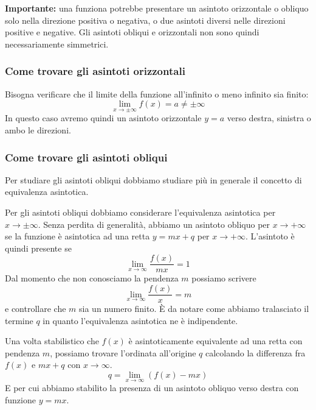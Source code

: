 \documentclass{article}
\begin{document}
\textbf{\color{red}Importante:} una funziona potrebbe presentare un asintoto orizzontale o obliquo
solo nella direzione positiva o negativa, o due asintoti diversi nelle direzioni positive e negative.
Gli asintoti obliqui e orizzontali non sono quindi necessariamente simmetrici.

\subsubsection{Come trovare gli asintoti orizzontali}

Bisogna verificare che il limite della funzione
all'infinito o meno infinito sia finito:\\
\[\lim_{x \to \pm\infty} f(x) = a \neq \pm\infty\]
In questo caso avremo quindi un asintoto orizzontale \(y=a\)
verso destra, sinistra o ambo le direzioni.

\subsubsection{Come trovare gli asintoti obliqui}

Per studiare gli asintoti obliqui dobbiamo studiare più in generale il concetto di equivalenza asintotica.


Per gli asintoti obliqui dobbiamo considerare l'equivalenza asintotica
per \(x \to \pm \infty\).
Senza perdita di generalità, abbiamo un asintoto obliquo per \(x \to +\infty\)
se la funzione è asintotica ad una retta \(y=mx+q\) per \(x \to +\infty\).
L'asintoto è quindi presente se
\[
    \lim_{x \to \infty} \frac{f(x)}{mx} = 1
\]
Dal momento che non conosciamo la pendenza \(m\) possiamo scrivere 
\[
    \lim_{x \to \infty} \frac{f(x)}{x} = m
\]
e controllare che \(m\) sia un numero finito.
È da notare come abbiamo tralasciato il termine \(q\) in quanto l'equivalenza asintotica ne è indipendente.

Una volta stabilistico che \(f(x)\) è asintoticamente equivalente ad una retta con pendenza \(m\),
possiamo trovare l'ordinata all'origine \(q\) calcolando la differenza fra
\(f(x)\) e \(mx+q\) con \(x \to \infty\).
\[
    q = \lim_{x\to\infty} \left(f(x)-mx\right)
\]
E per cui abbiamo stabilito la presenza di un asintoto obliquo verso destra
con funzione \(y=mx\).
\end{document}
